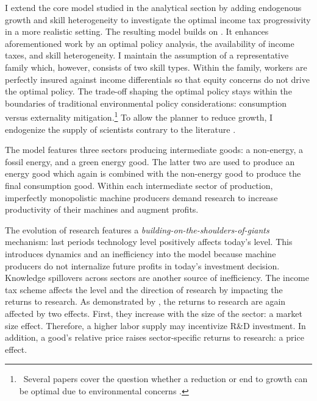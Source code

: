  I extend the core model studied in the analytical section by adding endogenous growth and skill heterogeneity to investigate the optimal income tax progressivity in a more realistic setting. The resulting model builds on \cite{Fried2018ClimateAnalysis}. It enhances aforementioned work by an optimal policy analysis, the availability of income taxes, and skill heterogeneity. 
I maintain the assumption of a representative family which, however, consists of two skill types. Within the family, workers are perfectly insured against income differentials so that equity concerns do not drive the optimal policy. The trade-off shaping the optimal policy stays within the boundaries of traditional environmental policy considerations: consumption versus externality mitigation.\footnote{\ Several papers cover the question whether a reduction or end to growth can be optimal due to environmental concerns \citep[for example,][]{Stokey1998AreGrowth, Acemoglu2012TheChange, Jones2016LifeGrowth}.}
To allow the planner to reduce growth, I endogenize the supply of scientists contrary to the literature \citep{Acemoglu2012TheChange, Fried2018ClimateAnalysis}. %

The model features three sectors producing intermediate goods:  a non-energy, a fossil energy, and a green energy good. The latter two are used to produce an energy good which again is combined with the non-energy good to produce the final consumption good.
Within each intermediate sector of production, imperfectly monopolistic machine producers demand research to increase productivity of their machines and augment profits. 

The evolution of research features a \textit{building-on-the-shoulders-of-giants} mechanism: last periods technology level positively affects today's level. This introduces dynamics and an inefficiency into the model because machine producers do not internalize future profits in today's investment decision. 
Knowledge spillovers across sectors are another source of inefficiency. The income tax scheme affects the level and the direction of research by impacting the returns to research.
As demonstrated by \cite{Acemoglu2002DirectedChange},
the returns to research are again affected by two effects. First, they increase with the size of the sector: a market size effect. Therefore, a higher labor supply may incentivize R\&D investment. In addition, a good's relative price raises sector-specific returns to research: a price effect. 


